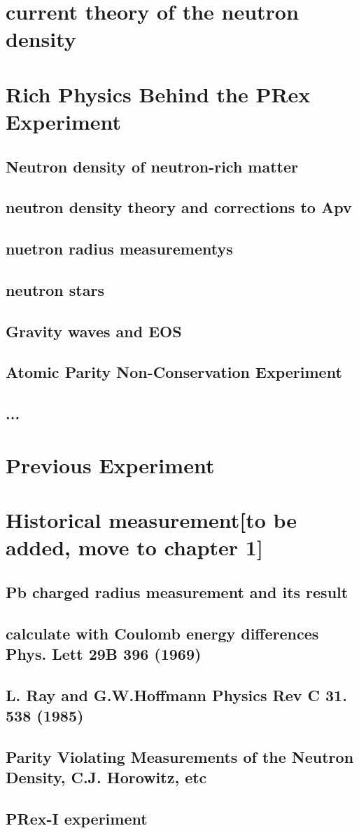 \section{current theory of the neutron density}

\section{Rich Physics Behind the PRex Experiment}
\subsection{Neutron density of neutron-rich matter}
\subsection{neutron density theory and corrections to Apv}
\subsection{nuetron radius measurementys}
\subsection{neutron stars}
\subsection{Gravity waves and EOS}
\subsection{Atomic Parity Non-Conservation Experiment}
\subsection{...}
\section{Previous Experiment}


\section{Historical measurement[to be added, move to chapter 1]}
\subsection{Pb charged radius measurement and its result }
\subsection{calculate with Coulomb energy differences Phys. Lett 29B 396 (1969)}
\subsection{L. Ray and G.W.Hoffmann Physics Rev C 31. 538 (1985)}
\subsection{ Parity Violating Measurements of the Neutron Density, C.J. Horowitz, etc}
\subsection{PRex-I experiment}
